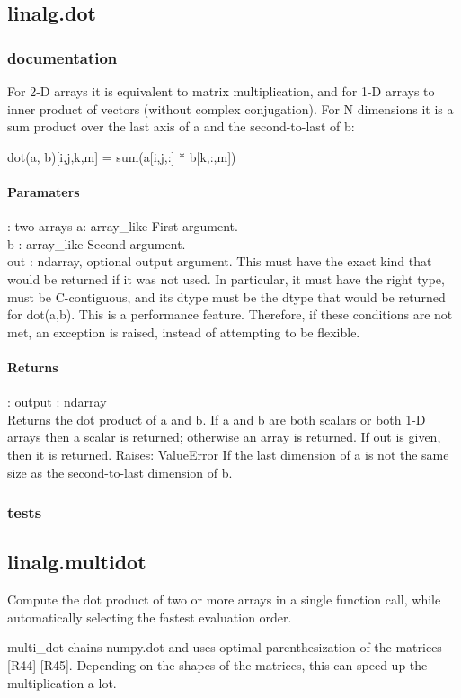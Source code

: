 \documentclass[a4paper,11pt]{article}
\begin{document}
\subsection{linalg.dot}
\subsubsection{documentation}
For 2-D arrays it is equivalent to matrix multiplication, and for 1-D arrays to inner product of vectors (without complex conjugation). For N dimensions it is a sum product over the last axis of a and the second-to-last of b:

    dot(a, b)[i,j,k,m] = sum(a[i,j,:] * b[k,:,m])
   \paragraph{Paramaters}: two arrays a: array\_like First argument.\\
b : array\_like Second argument.\\
out : ndarray, optional output argument. This must have the exact kind that would be returned if it was not used. In particular, it must have the right type, must be C-contiguous, and its dtype must be the dtype that would be returned for dot(a,b). This is a performance feature. Therefore, if these conditions are not met, an exception is raised, instead of attempting to be flexible.
    \paragraph{Returns}:    output : ndarray\\
Returns the dot product of a and b. If a and b are both scalars or both 1-D arrays then a scalar is returned; otherwise an array is returned. If out is given, then it is returned.
Raises: 
ValueError
If the last dimension of a is not the same size as the second-to-last dimension of b.


\subsubsection{tests}


\subsection{linalg.multidot}
Compute the dot product of two or more arrays in a single function call, while automatically selecting the fastest evaluation order.

multi\_dot chains numpy.dot and uses optimal parenthesization of the matrices [R44] [R45]. Depending on the shapes of the matrices, this can speed up the multiplication a lot.
\end{document}

